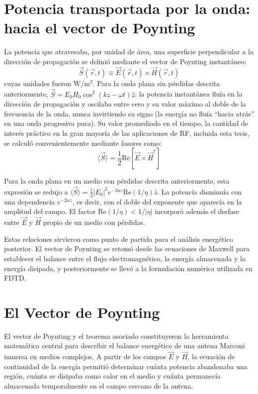 \section{Potencia transportada por la onda: hacia el vector de Poynting}
La potencia que atravesaba, por unidad de área, una superficie perpendicular a la dirección de propagación se definió mediante el vector de Poynting instantáneo:
\begin{equation}
    \vec{S}(\vec{r}, t) \equiv \vec{E}(\vec{r}, t)\times\vec{H}(\vec{r}, t)
\end{equation}
cuyas unidades fueron $\mathrm{W/m^2}$. Para la onda plana sin pérdidas descrita anteriormente, $\vec{S}=E_0 H_0\cos^2(kz-\omega t)\hat{z}$: la potencia instantánea fluía en la dirección de propagación y oscilaba entre cero y su valor máximo al doble de la frecuencia de la onda, nunca invirtiendo su signo (la energía no fluía ``hacia atrás'' en una onda progresiva pura). Su valor promediado en el tiempo, la cantidad de interés práctico en la gran mayoría de las aplicaciones de RF, incluida esta tesis, se calculó convenientemente mediante fasores como:
\begin{equation}
    \langle\vec{S}\rangle = \frac{1}{2}\text{Re}\left[\vec{E}\times\vec{H}^{*}\right]
\end{equation}

Para la onda plana en un medio con pérdidas descrita anteriormente, esta expresión se redujo a $\langle\vec{S}\rangle = \frac{1}{2}|E_0|^2 e^{-2\alpha z}\text{Re}(1/\eta)\hat{z}$. La potencia disminuía con una dependencia $e^{-2\alpha z}$, es decir, con el doble del exponente que aparecía en la amplitud del campo. El factor $\text{Re}(1/\eta)<1/|\eta|$ incorporó además el desfase entre $\vec{E}$ y $\vec{H}$ propio de un medio con pérdidas.

Estas relaciones sirvieron como punto de partida para el análisis energético posterior. El vector de Poynting se retomó desde las ecuaciones de Maxwell para establecer el balance entre el flujo electromagnético, la energía almacenada y la energía disipada, y posteriormente se llevó a la formulación numérica utilizada en FDTD.

\section{El Vector de Poynting}

El vector de Poynting y el teorema asociado constituyeron la herramienta matemática central para describir el balance energético de una antena Marconi inmersa en medios complejos. A partir de los campos $\vec{E}$ y $\vec{H}$, la ecuación de continuidad de la energía permitió determinar cuánta potencia abandonaba una región, cuánta se disipaba como calor en el medio y cuánta permanecía almacenada temporalmente en el campo cercano de la antena.

